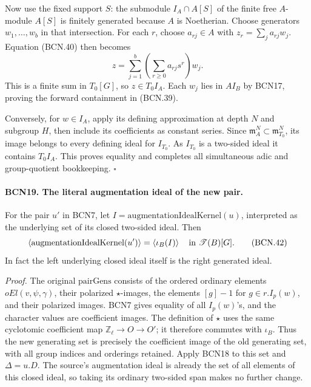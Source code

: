 Now use the fixed support \(S\): the submodule
\(I_A\cap A[S]\) of the finite free \(A\)-module \(A[S]\)
is finitely generated because \(A\) is Noetherian.
Choose generators \(w_1,\ldots,w_b\) in that intersection.
For each \(r\), choose \(a_{rj}\in A\) with
\(z_r=\sum_j a_{rj}w_j\).  Equation (BCN.40) then becomes
\[
 z=\sum_{j=1}^b\left(\sum_{r\ge0}a_{rj}s^r\right)w_j.
                                                               \tag{BCN.41}
\]
This is a finite sum in \(T_0[G]\), so \(z\in T_0I_A\).
Each \(w_j\) lies in \(AI_B\) by BCN17, proving the
forward containment in (BCN.39).

Conversely, for \(w\in I_A\), apply its defining
approximation at depth \(N\) and subgroup \(H\), then
include its coefficients as constant series.  Since
\(\mathfrak m_A^N\subset\mathfrak m_{T_0}^N\), its image
belongs to every defining ideal for \(I_{T_0}\).
As \(I_{T_0}\) is a two-sided ideal it contains \(T_0I_A\).
This proves equality and completes all simultaneous
adic and group-quotient bookkeeping.
\hfill\(\square\)

\paragraph{BCN19. The literal augmentation ideal of the new pair.}\label{claim:BCN19}
For the pair \(u'\) in BCN7, let
\(I=\mathrm{augmentationIdealKernel}(u)\), interpreted
as the underlying set of its closed two-sided ideal.
Then
\[
 \left\langle\mathrm{augmentationIdealKernel}(u')\right\rangle
 =
 \left\langle\iota_B(I)\right\rangle
 \quad\hbox{in }\mathscr T(B)[G].                               \tag{BCN.42}
\]
In fact the left underlying closed ideal itself is the
right generated ideal.

\emph{Proof.}
The original \(\mathrm{pairGens}\) consists of the
ordered ordinary elements \(oEl(v,\psi,\gamma)\), their
polarized \(\star\)-images, the elements \([g]-1\) for
\(g\in r.I_p(w)\), and their polarized images.
BCN7 gives equality of all \(I_p(w)\)'s, and the character
values are coefficient images.  The definition of
\(\star\) uses the same cyclotomic coefficient map
\(\mathbb Z_\ell\to O\to O'\); it therefore commutes with
\(\iota_B\).  Thus the new generating set is precisely
the coefficient image of the old generating set, with
all group indices and orderings retained.
Apply BCN18 to this set and \(\Delta=u.D\).
The source's augmentation ideal is already the set of
all elements of this closed ideal, so taking its ordinary
two-sided span makes no further change.

